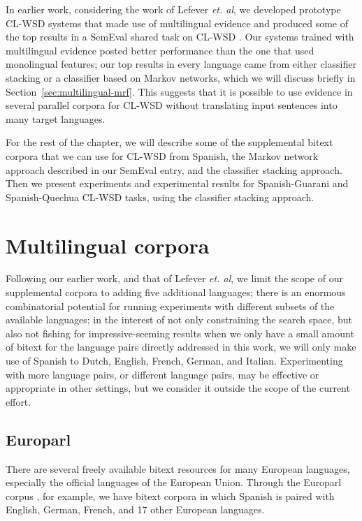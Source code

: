 In earlier work, considering the work of Lefever \emph{et. al}, we developed
prototype CL-WSD systems that made use of multilingual evidence
\cite{rudnick-liu-gasser:2013:SemEval-2013} and produced some of the top
results in a SemEval shared task on CL-WSD \cite{task10}.
Our systems trained with multilingual evidence posted better performance than
the one that used monolingual features; our top results in every language came
from either classifier stacking or a classifier based on Markov networks,
which we will discuss briefly in Section~\ref{sec:multilingual-mrf}. This
suggests that it is possible to use evidence in several parallel corpora for
CL-WSD without translating input sentences into many target languages.

For the rest of the chapter, we will describe some of the supplemental bitext
corpora that we can use for CL-WSD from Spanish, the Markov network approach
described in our SemEval entry, and the classifier stacking approach. Then we
present experiments and experimental results for Spanish-Guarani and
Spanish-Quechua CL-WSD tasks, using the classifier stacking approach.

\section{Multilingual corpora} 

Following our earlier work, and that of Lefever \emph{et. al}, we limit the
scope of our supplemental corpora to adding five additional languages; there is
an enormous combinatorial potential for running experiments with different
subsets of the available languages; in the interest of not only constraining
the search space, but also not fishing for impressive-seeming results when we
only have a small amount of bitext for the language pairs directly addressed in
this work, we will only make use of Spanish to Dutch, English, French, German,
and Italian. Experimenting with more language pairs, or different language
pairs, may be effective or appropriate in other settings, but we consider it
outside the scope of the current effort.

\subsection{Europarl}
There are several freely available bitext resources for many European
languages, especially the official languages of the European Union. Through the
Europarl corpus \cite{europarl}, for example, we have bitext corpora in which
Spanish is paired with English, German, French, and 17 other European
languages.

